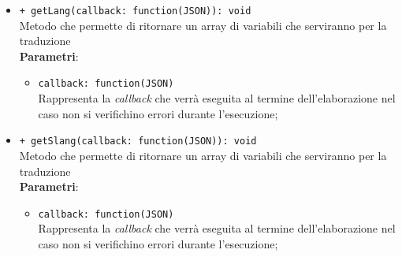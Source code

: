 \begin{itemize}
\begin{itemize}
\begin{itemize}
					\end{itemize}
				\item \texttt{+ getLang(callback: function(JSON)): void} \\
				Metodo che permette di ritornare un array di variabili che serviranno per la traduzione \\
					\textbf{Parametri}:
					\begin{itemize}
						\item \texttt{callback: function(JSON)} \\
						Rappresenta la \textit{callback} che verrà eseguita al termine dell'elaborazione nel caso non si verifichino errori durante l'esecuzione;
					\end{itemize}	
				\item \texttt{+ getSlang(callback: function(JSON)): void} \\
				Metodo che permette di ritornare un array di variabili che serviranno per la traduzione \\
					\textbf{Parametri}:
					\begin{itemize}
							\item \texttt{callback: function(JSON)} \\
							Rappresenta la \textit{callback} che verrà eseguita al termine dell'elaborazione nel caso non si verifichino errori durante l'esecuzione;
					\end{itemize}	
			\end{itemize}
	\end{itemize}
	